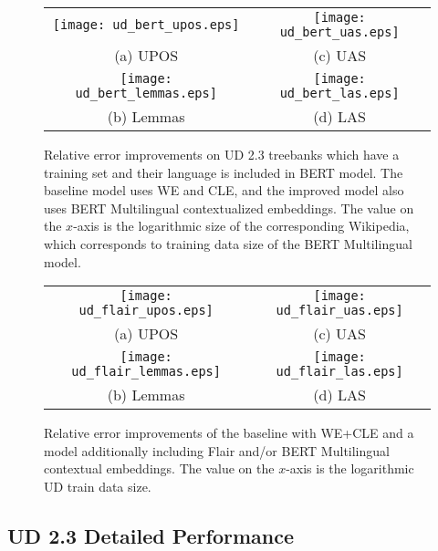 \documentclass[11pt,a4paper]{article}
\begin{document}
\begin{figure*}[p]
  \begin{center}
    \setlength{\tabcolsep}{0pt}\begin{tabular}{cc}
      \texttt{[image: ud\_bert\_upos.eps]} & \texttt{[image: ud\_bert\_uas.eps]} \\
      (a) UPOS & (c) UAS \\[10pt]
      \texttt{[image: ud\_bert\_lemmas.eps]} & \texttt{[image: ud\_bert\_las.eps]} \\
      (b) Lemmas & (d) LAS \\
    \end{tabular}
  \end{center}
  \caption{Relative error improvements on UD 2.3 treebanks which have
  a training set and their language is included in BERT model. The baseline
  model uses WE and CLE, and the improved model also uses BERT Multilingual
  contextualized embeddings. The value on the $x$-axis is the logarithmic size of the
  corresponding Wikipedia, which corresponds to training data size of the BERT
  Multilingual model.}
  \label{figure:bert_wiki}

  \vspace{2.5\baselineskip}

  \begin{center}
    \setlength{\tabcolsep}{0pt}\begin{tabular}{cc}
      \texttt{[image: ud\_flair\_upos.eps]} & \texttt{[image: ud\_flair\_uas.eps]} \\
      (a) UPOS & (c) UAS \\[10pt]
      \texttt{[image: ud\_flair\_lemmas.eps]} & \texttt{[image: ud\_flair\_las.eps]} \\
      (b) Lemmas & (d) LAS \\
    \end{tabular}
  \end{center}
  \caption{Relative error improvements of the baseline with WE+CLE and
  a model additionally including Flair and/or BERT Multilingual contextual
  embeddings. The value on the $x$-axis is the logarithmic UD train data size.}
  \label{figure:flair_bert_size}
\end{figure*}

\subsection{UD 2.3 Detailed Performance}
\end{document}
